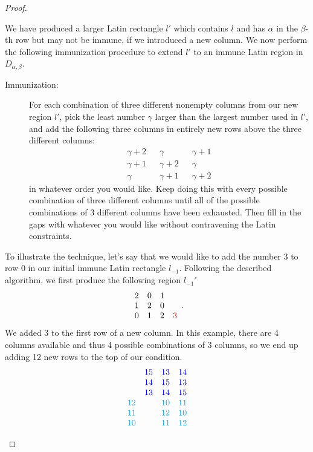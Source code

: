 \documentclass[12pt,a4paper]{article}
\begin{document}
\begin{proof}
\begin{enumerate}
	We have produced a larger Latin rectangle $l'$ which contains $l$ and has $\alpha$ in the $\beta$-th row but may not be immune, if we introduced a new column. We now perform the following immunization procedure to extend $l'$ to an immune Latin region in $D_{\alpha,\beta}$.
\begin{description}
		\item[Immunization:] For each combination of three different nonempty columns from our new region $l'$, pick the least number $\gamma$ larger than the largest number used in $l'$, and add the following three columns in entirely new rows above the three different columns: 
				$$\begin{array}{ccccc}
			\gamma+2  && \gamma   &&  \gamma+1 \\ 
			\gamma+1  && \gamma+2 &&  \gamma \\
			\gamma  && \gamma+1 && \gamma+2
		\end{array}$$ in whatever order you would like. Keep doing this with every possible combination of three different columns until all of the possible combinations of 3 different columns have been exhausted. Then fill in the gaps with whatever you would like without contravening the Latin constraints. 
		\end{description}
		To illustrate the technique, let's say that we would like to add the number $3$ to row $0$ in our initial immune Latin rectangle $l_{-1}$. Following the described algorithm, we first produce
		the following region $l_{-1}'$ 
		$$\begin{array}{cccc}
			2  & 0   &  1 &  \\ 
			1 & 2 &  0  &\\
			 0  & 1 & 2 & \color{red} 3
		\end{array}.$$
		We added 3 to the first row of a new column. In this example, there are 4 columns available and thus 4 possible combinations of 3 columns, so we end up adding 12 new rows to the top of our condition.		
		$$\begin{array}{cccc}
						&\color{blue}15& \color{blue}13&\color{blue}14\\
						&\color{blue}14&\color{blue}15&\color{blue}13\\
						&\color{blue}13&\color{blue}14&\color{blue}15\\
						\color{cyan}12&&\color{cyan}10&\color{cyan}11\\
						\color{cyan}11&&\color{cyan}12&\color{cyan}10\\
						\color{cyan}10&&\color{cyan}11&\color{cyan}12\\

\end{array}$$
\end{enumerate}
\end{proof}
\end{document}
